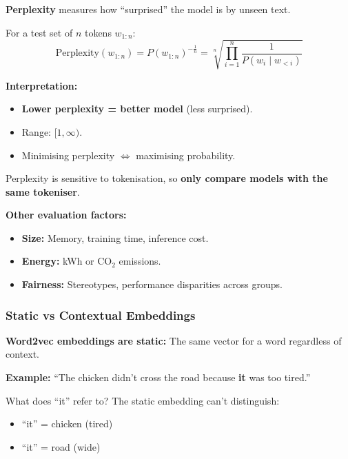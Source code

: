 \begin{defbox}[Perplexity]
\textbf{Perplexity} measures how ``surprised'' the model is by unseen text.

For a test set of $n$ tokens $w_{1:n}$:
\[
\text{Perplexity}(w_{1:n}) = P(w_{1:n})^{-\frac{1}{n}} = \sqrt[n]{\prod_{i=1}^{n} \frac{1}{P(w_i \mid w_{<i})}}
\]

\textbf{Interpretation:}
\begin{itemize}
  \item \textbf{Lower perplexity = better model} (less surprised).
  \item Range: $[1, \infty)$.
  \item Minimising perplexity $\Leftrightarrow$ maximising probability.
\end{itemize}
\end{defbox}

\begin{tipbox}
Perplexity is sensitive to tokenisation, so \textbf{only compare models with the same tokeniser}.
\end{tipbox}

\textbf{Other evaluation factors:}
\begin{itemize}
  \item \textbf{Size:} Memory, training time, inference cost.
  \item \textbf{Energy:} kWh or CO$_2$ emissions.
  \item \textbf{Fairness:} Stereotypes, performance disparities across groups.
\end{itemize}

\bigseparator

\subsubsection{Static vs Contextual Embeddings}

\begin{tipbox}
\textbf{Word2vec embeddings are static:} The same vector for a word regardless of context.

\textbf{Example:} ``The chicken didn't cross the road because \textbf{it} was too tired.''

What does ``it'' refer to? The static embedding can't distinguish:
\begin{itemize}
  \item ``it'' = chicken (tired)
  \item ``it'' = road (wide)
\end{itemize}
\end{tipbox}

